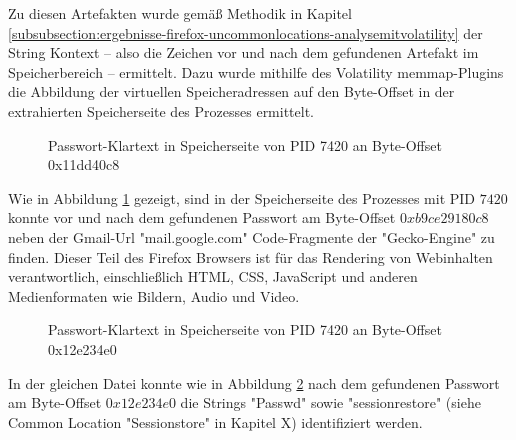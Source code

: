 Zu diesen Artefakten wurde gemäß Methodik in Kapitel \ref{subsubsection:ergebnisse-firefox-uncommonlocations-analysemitvolatility} der String Kontext -- also die Zeichen vor und nach dem gefundenen Artefakt im Speicherbereich -- ermittelt. Dazu wurde mithilfe des Volatility memmap-Plugins die Abbildung der virtuellen Speicheradressen auf den Byte-Offset in der extrahierten Speicherseite des Prozesses ermittelt. 
\begin{figure}[h!]
	\centerline{}
	\label{img:firefox-pw-offset-0x11dd40c8}  
	\caption{Passwort-Klartext in Speicherseite von PID 7420 an Byte-Offset 0x11dd40c8}
\end{figure}

Wie in Abbildung \ref{img:firefox-pw-offset-0x11dd40c8} gezeigt, sind in der Speicherseite des Prozesses mit PID $7420$ konnte vor und nach dem gefundenen Passwort am Byte-Offset $0xb9ce29180c8$ neben der Gmail-Url "mail.google.com" Code-Fragmente der "Gecko-Engine" zu finden. Dieser Teil des Firefox Browsers ist für das Rendering von Webinhalten verantwortlich, einschließlich HTML, CSS, JavaScript und anderen Medienformaten wie Bildern, Audio und Video.
\begin{figure}[h!]
	\centerline{}
	\label{img:firefox-pw-offset-pid-7420-0x12e234e0}  
	\caption{Passwort-Klartext in Speicherseite von PID 7420 an Byte-Offset 0x12e234e0}
\end{figure}
In der gleichen Datei konnte wie in Abbildung \ref{img:firefox-pw-offset-pid-7420-0x12e234e0} nach dem gefundenen Passwort am Byte-Offset $0x12e234e0$ die Strings "Passwd" sowie "sessionrestore" (siehe Common Location "Sessionstore" in Kapitel X) identifiziert werden. 

